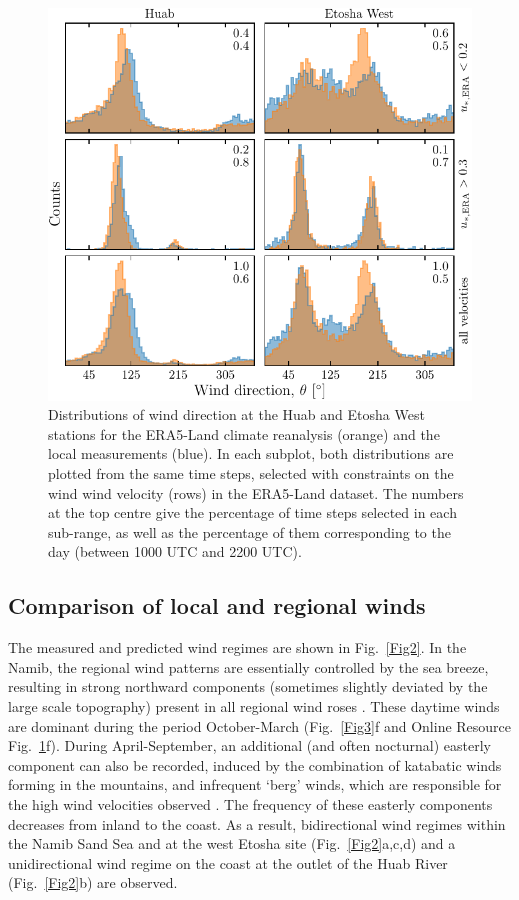 
\begin{figure}
\centering
\includegraphics[scale=1]{Figures/Figure4.pdf}
\caption{Distributions of wind direction at the Huab and Etosha West stations for the
ERA5-Land climate reanalysis (orange) and the local measurements (blue). In each subplot,
both distributions are plotted from the same time steps, selected with constraints on the
wind wind velocity (rows) in the ERA5-Land dataset. The numbers at the top centre give
the percentage of time steps selected in each sub-range, as well as the percentage of them
corresponding to the day (between 1000 UTC and 2200 UTC).}
\label{Fig4}
\end{figure}

\subsection{Comparison of local and regional winds}
\label{section_data_feedback}
The measured and predicted wind regimes are shown in Fig.~\ref{Fig2}. In the Namib, the regional wind patterns are essentially controlled by the sea breeze, resulting in strong northward components (sometimes slightly deviated by the large scale topography) present in all regional wind roses \citep{lancaster1985}. These daytime winds are dominant during the period October-March (Fig.~\ref{Fig3}f and Online Resource Fig.~\ref{Fig4}f). During April-September, an additional (and often nocturnal) easterly component can also be recorded, induced by the combination of katabatic winds forming in the mountains, and infrequent `berg' winds, which are responsible for the high wind velocities observed \citep{lancaster1984}. The frequency of these easterly components decreases from inland to the coast. As a result, bidirectional wind regimes within the Namib Sand Sea and at the west Etosha site (Fig.~\ref{Fig2}a,c,d) and a unidirectional wind regime on the coast at the outlet of the Huab River (Fig.~\ref{Fig2}b) are observed.

